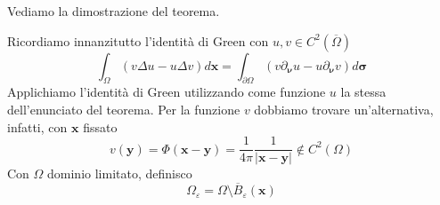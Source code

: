 \documentclass[10pt,a4paper,twoside,openright]{book}
\newcommand{\x}{\mathbf{x}}
\newcommand{\y}{\mathbf{y}}
\begin{document}
Vediamo la dimostrazione del teorema.
\begin{dimostrazione}
	Ricordiamo innanzitutto l'identità di Green con $\displaystyle u,v\in C^{2}(\overline{\Omega })$
	\begin{equation*}
	\int _{\Omega }( v\Delta u-u\Delta v) d\x =\int _{\partial \Omega }( v\partial _{\bm{\nu}} u-u\partial _{\bm{\nu}} v) d\bm{\sigma }
	\end{equation*}
	Applichiamo l'identità di Green utilizzando come funzione $\displaystyle u$ la stessa dell'enunciato del teorema. Per la funzione $\displaystyle v$ dobbiamo trovare un'alternativa, infatti, con $\displaystyle \x$ fissato
	\begin{equation*}
	v(\y) =\Phi (\x -\y) =\frac{1}{4\pi }\frac{1}{| \x -\y| } \notin C^{2}( \Omega )
	\end{equation*}
	Con $\displaystyle \Omega $ dominio limitato, definisco 
	\begin{equation*}
	\Omega _{\varepsilon } =\Omega \setminus \overline{B}_{\varepsilon }(\x)
	\end{equation*}
	\begin{figure}[H]
		\centering

		\begin{tikzpicture}[x=0.75pt,y=0.75pt,yscale=-1,xscale=1]


\end{tikzpicture}
\end{figure}
\end{dimostrazione}
\end{document}
